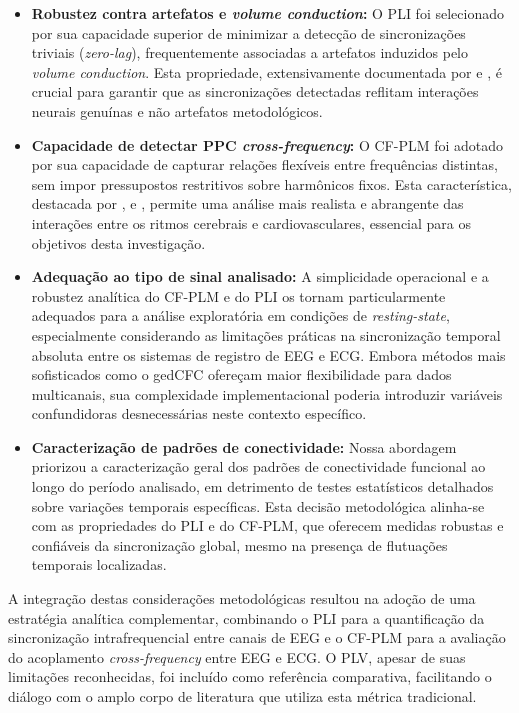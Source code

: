 \begin{itemize}
  \item \textbf{Robustez contra artefatos e \textit{volume conduction}:} O PLI foi selecionado por sua capacidade superior de minimizar a detecção de sincronizações triviais (\textit{zero-lag}), frequentemente associadas a artefatos induzidos pelo \textit{volume conduction}. Esta propriedade, extensivamente documentada por  e , é crucial para garantir que as sincronizações detectadas reflitam interações neurais genuínas e não artefatos metodológicos.

  \item \textbf{Capacidade de detectar PPC \textit{cross-frequency}:} O CF-PLM foi adotado por sua capacidade de capturar relações flexíveis entre frequências distintas, sem impor pressupostos restritivos sobre harmônicos fixos. Esta característica, destacada por ,  e , permite uma análise mais realista e abrangente das interações entre os ritmos cerebrais e cardiovasculares, essencial para os objetivos desta investigação.

  \item \textbf{Adequação ao tipo de sinal analisado:} A simplicidade operacional e a robustez analítica do CF-PLM e do PLI os tornam particularmente adequados para a análise exploratória em condições de \textit{resting-state}, especialmente considerando as limitações práticas na sincronização temporal absoluta entre os sistemas de registro de EEG e ECG. Embora métodos mais sofisticados como o gedCFC ofereçam maior flexibilidade para dados multicanais, sua complexidade implementacional poderia introduzir variáveis confundidoras desnecessárias neste contexto específico.

  \item \textbf{Caracterização de padrões de conectividade:} Nossa abordagem priorizou a caracterização geral dos padrões de conectividade funcional ao longo do período analisado, em detrimento de testes estatísticos detalhados sobre variações temporais específicas. Esta decisão metodológica alinha-se com as propriedades do PLI e do CF-PLM, que oferecem medidas robustas e confiáveis da sincronização global, mesmo na presença de flutuações temporais localizadas.
\end{itemize}

A integração destas considerações metodológicas resultou na adoção de uma estratégia analítica complementar, combinando o PLI para a quantificação da sincronização intrafrequencial entre canais de EEG e o CF-PLM para a avaliação do acoplamento \textit{cross-frequency} entre EEG e ECG. O PLV, apesar de suas limitações reconhecidas, foi incluído como referência comparativa, facilitando o diálogo com o amplo corpo de literatura que utiliza esta métrica tradicional.

